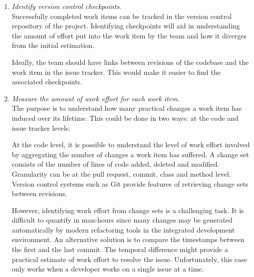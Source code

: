 \documentclass{mprop}
\begin{document}
\begin{enumerate}
	\item \textit{Identify version control checkpoints}.\\
	      Successfully completed work items can be tracked in the version control
	      repository of the project. Identifying checkpoints will aid in understanding
	      the amount of effort put into the work item by the team and how it diverges
	      from the initial estimation.

	      Ideally, the team should have links between revisions of the codebase and
	      the work item in the issue tracker. This would make it easier to find the
	      associated checkpoints.

	\item \textit{Measure the amount of work effort for each work item}.\\
	      The purpose is to understand how many practical changes a work item has
	      induced over its lifetime. This could be done in two ways: at the code and
	      issue tracker levels.

	      At the code level, it is possible to understand the level of work effort
	      involved by aggregating the number of changes a work item has suffered. A
	      change set consists of the number of lines of code added, deleted and
	      modified. Granularity can be at the pull request, commit, class and method
	      level. Version control systems such as Git provide features of retrieving
	      change sets between revisions.

	      However, identifying work effort from change sets is a challenging task. It
	      is difficult to quantify in man-hours since many changes may be generated
	      automatically by modern refactoring tools in the integrated development
	      environment. An alternative solution is to compare the timestamps between
	      the first and the last commit. The temporal difference might provide a
	      practical estimate of work effort to resolve the issue. Unfortunately, this
	      case only works when a developer works on a single issue at a time.


\end{enumerate}
\end{document}
